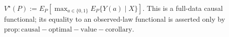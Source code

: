 \(V^\star(P):=E_P[\max_{a\in\{0,1\}}E_P\{Y(a)\mid X\}]\).  This is a full-data causal functional; its equality to an observed-law functional is asserted only by \(\mathrm{prop:causal-optimal-value-corollary}\).